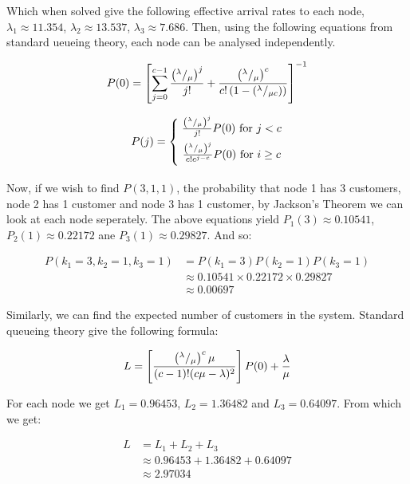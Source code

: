 \documentclass{article}
\begin{document}
Which when solved give the following effective arrival rates to each node, $\lambda_1 \approx 11.354$, $\lambda_2 \approx 13.537$, $\lambda_3 \approx 7.686$.
Then, using the following equations from standard ueueing theory, each node can be analysed independently.

\begin{equation}
P(0) = \left[\sum_{j=0}^{c-1}{\left({^\lambda / _\mu}\right)^j\over j!}+{\left({^\lambda / _\mu}\right)^c\over c!\left(1-{\left(^\lambda / _{\mu c}\right)} \right)}\right]^{-1}
\end{equation}

\begin{equation}
P(j)=\left\{\;\begin{array}{@{}c@{}}
{\left({^\lambda / _\mu}\right)^j\over j!}P(0)\text{ for }j<c\\[2mm]
{\left({^\lambda / _\mu}\right)^j\over c!c^{j-c}}P(0)\text{ for }i\geq c\\[2mm]
\end{array}
\right.
\end{equation}

Now, if we wish to find $P(3, 1, 1)$, the probability that node 1 has 3 customers, node 2 has 1 customer and node 3 has 1 customer, by Jackson's Theorem we can look at each node seperately.
The above equations yield $P_1(3) \approx 0.10541$, $P_2(1) \approx 0.22172$ ane $P_3(1) \approx 0.29827$.
And so:

\begin{equation*}
    \begin{split}
    P( k_1 = 3, k_2 = 1, k_3 = 1 ) & = P(k_1 = 3) P(k_2 = 1) P(k_3 = 1) \\
    & \approx 0.10541 \times 0.22172 \times 0.29827 \\
    & \approx 0.00697
    \end{split}
\end{equation*}

Similarly, we can find the expected number of customers in the system. Standard queueing theory give the following formula:

\begin{equation}
    L = \left[ { \left( ^\lambda / _\mu \right)^c \mu \over (c - 1)! (c \mu - \lambda)^2 } \right] P(0) + \frac{\lambda}{\mu}
\end{equation}

For each node we get $L_1 = 0.96453$, $L_2 = 1.36482$ and $L_3 = 0.64097$.
From which we get:

\begin{equation*}
    \begin{split}
    L & = L_1 + L_2 + L_3\\
    & \approx 0.96453 + 1.36482 + 0.64097 \\
    & \approx 2.97034
    \end{split}
\end{equation*}
\end{document}
